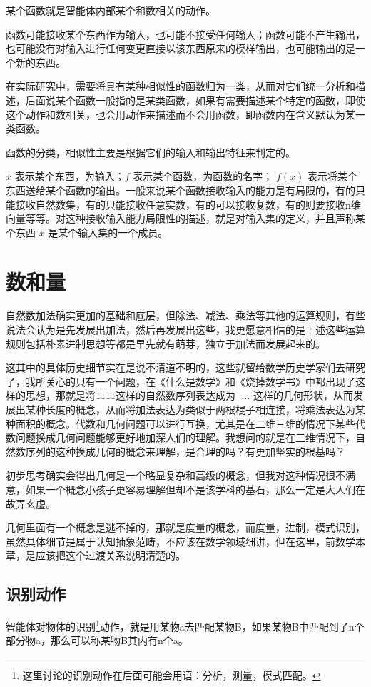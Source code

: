\documentclass[12pt,oneside]{book}
\begin{document}
某个函数就是智能体内部某个和数相关的动作。

函数可能接收某个东西作为输入，也可能不接受任何输入；函数可能不产生输出，也可能没有对输入进行任何变更直接以该东西原来的模样输出，也可能输出的是一个新的东西。

在实际研究中，需要将具有某种相似性的函数归为一类，从而对它们统一分析和描述，后面说某个函数一般指的是某类函数，如果有需要描述某个特定的函数，即使这个动作和数相关，也会用动作来描述而不会用函数，即函数内在含义默认为某一类函数。

函数的分类，相似性主要是根据它们的输入和输出特征来判定的。

$x$ 表示某个东西，为输入；$f$ 表示某个函数，为函数的名字； $f(x)$ 表示将某个东西送给某个函数的输出。一般来说某个函数接收输入的能力是有局限的，有的只能接收自然数集，有的只能接收任意实数，有的可以接收复数，有的则要接收n维向量等等。对这种接收输入能力局限性的描述，就是对输入集的定义，并且声称某个东西 $x$ 是某个输入集的一个成员。



\section{数和量}
自然数加法确实更加的基础和底层，但除法、减法、乘法等其他的运算规则，有些说法会认为是先发展出加法，然后再发展出这些，我更愿意相信的是上述这些运算规则包括朴素进制思想等都是早先就有萌芽，独立于加法而发展起来的。

这其中的具体历史细节实在是说不清道不明的，这些就留给数学历史学家们去研究了，我所关心的只有一个问题，在《什么是数学》和《烧掉数学书》中都出现了这样的思想，那就是将$1 1 1 1$这样的自然数序列表达成为 $. . . .$ 这样的几何形状，从而发展出某种长度的概念，从而将加法表达为类似于两根棍子相连接，将乘法表达为某种面积的概念。代数和几何问题可以进行互换，尤其是在二维三维的情况下某些代数问题换成几何问题能够更好地加深人们的理解。我想问的就是在三维情况下，自然数序列的这种换成几何的概念来理解，是合理的吗？有更加坚实的根基吗？

初步思考确实会得出几何是一个略显复杂和高级的概念，但我对这种情况很不满意，如果一个概念小孩子更容易理解但却不是该学科的基石，那么一定是大人们在故弄玄虚。

几何里面有一个概念是逃不掉的，那就是度量的概念，而度量，进制，模式识别，虽然具体细节是属于认知抽象范畴，不应该在数学领域细讲，但在这里，前数学本章，是应该把这个过渡关系说明清楚的。

\subsection{识别动作}
智能体对物体的识别\footnote{这里讨论的识别动作在后面可能会用语：分析，测量，模式匹配。}动作，就是用某物a去匹配某物B，如果某物B中匹配到了n个部分物a，那么可以称某物B其内有n个a。
\end{document}
